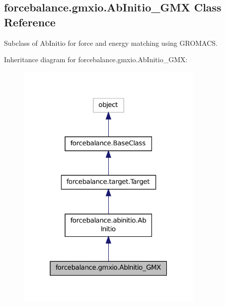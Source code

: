 \hypertarget{classforcebalance_1_1gmxio_1_1AbInitio__GMX}{\subsection{forcebalance.\-gmxio.\-Ab\-Initio\-\_\-\-G\-M\-X Class Reference}
\label{classforcebalance_1_1gmxio_1_1AbInitio__GMX}
}


Subclass of Ab\-Initio for force and energy matching using G\-R\-O\-M\-A\-C\-S.  




Inheritance diagram for forcebalance.\-gmxio.\-Ab\-Initio\-\_\-\-G\-M\-X\-:
\nopagebreak
\begin{figure}[H]
\begin{center}
\leavevmode
\includegraphics[width=256pt]{classforcebalance_1_1gmxio_1_1AbInitio__GMX__inherit__graph}
\end{center}
\end{figure}


